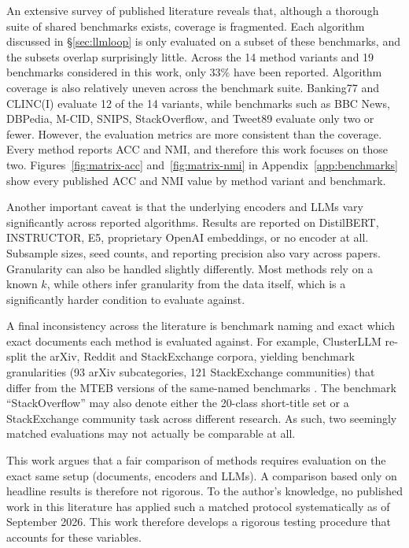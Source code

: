 \documentclass[11pt,a4paper,oneside]{report}
\begin{document}
An extensive survey of published literature reveals that, although a thorough suite of shared benchmarks exists, coverage is fragmented. Each algorithm discussed in \S\ref{sec:llmloop} is only evaluated on a subset of these benchmarks, and the subsets overlap surprisingly little. Across the 14 method variants and 19 benchmarks considered in this work, only $33\%$ have been reported. Algorithm coverage is also relatively uneven across the benchmark suite. Banking77 and CLINC(I) evaluate 12 of the 14 variants, while benchmarks such as BBC News, DBPedia, M-CID, SNIPS, StackOverflow, and Tweet89 evaluate only two or fewer. However, the evaluation metrics are more consistent than the coverage. Every method reports ACC and NMI, and therefore this work focuses on those two. Figures~\ref{fig:matrix-acc} and~\ref{fig:matrix-nmi} in Appendix~\ref{app:benchmarks} show every published ACC and NMI value by method variant and benchmark.

Another important caveat is that the underlying encoders and LLMs vary significantly across reported algorithms. Results are reported on DistilBERT, INSTRUCTOR, E5, proprietary OpenAI embeddings, or no encoder at all. Subsample sizes, seed counts, and reporting precision also vary across papers. Granularity can also be handled slightly differently. Most methods rely on a known $k$, while others infer granularity from the data itself, which is a significantly harder condition to evaluate against.

A final inconsistency across the literature is benchmark naming and exact which exact documents each method is evaluated against. For example, ClusterLLM re-split the arXiv, Reddit and StackExchange corpora, yielding benchmark granularities (93 arXiv subcategories, 121 StackExchange communities) that differ from the MTEB versions of the same-named benchmarks \citep{zhang2023clusterllm}. The benchmark ``StackOverflow'' may also denote either the 20-class short-title set \citep{xu2017selftaught} or a StackExchange community task across different research. As such, two seemingly matched evaluations may not actually be comparable at all.

This work argues that a fair comparison of methods requires evaluation on the exact same setup (documents, encoders and LLMs). A comparison based only on headline results is therefore not rigorous. To the author's knowledge, no published work in this literature has applied such a matched protocol systematically as of September 2026. This work therefore develops a rigorous testing procedure that accounts for these variables.
\end{document}
